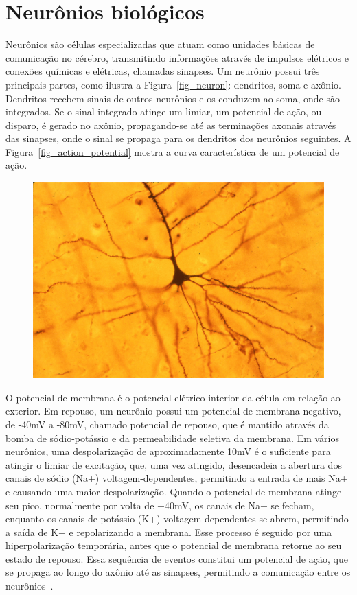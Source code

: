 \section{Neurônios biológicos}\label{sec_neurônios}

Neurônios são células especializadas que atuam como unidades básicas de comunicação no cérebro, transmitindo informações através
de impulsos elétricos e conexões químicas e elétricas, chamadas sinapses. Um neurônio possui três principais partes, como ilustra
a Figura~\ref{fig_neuron}: dendritos, soma e axônio. Dendritos recebem sinais de outros neurônios e os conduzem ao soma,
onde são integrados. Se o sinal integrado atinge um limiar, um potencial de ação, ou disparo, é gerado no axônio, propagando-se
até as terminações axonais através das sinapses, onde o sinal se propaga para os dendritos dos neurônios seguintes. A
Figura~\ref{fig_action_potential} mostra a curva característica de um potencial de ação.

\begin{figure}[!ht]
\centering
\includegraphics[width=12cm]{figuras/neuron.png}
\end{figure}

O potencial de membrana é o potencial elétrico interior da célula em relação ao exterior. Em repouso, um neurônio possui um
potencial de membrana negativo, de -40mV a -80mV, chamado potencial de repouso, que é mantido através da bomba de sódio-potássio e
da permeabilidade seletiva da membrana. Em vários neurônios, uma despolarização de aproximadamente 10mV é o suficiente para
atingir o limiar de excitação, que, uma vez atingido, desencadeia a abertura dos canais de sódio (Na+) voltagem-dependentes,
permitindo a entrada de mais Na+ e causando uma maior despolarização. Quando o potencial de membrana atinge seu pico, normalmente
por volta de +40mV, os canais de Na+ se fecham, enquanto os canais de potássio (K+) voltagem-dependentes se abrem, permitindo a
saída de K+ e repolarizando a membrana. Esse processo é seguido por uma hiperpolarização temporária, antes que o potencial de
membrana retorne ao seu estado de repouso. Essa sequência de eventos constitui um potencial de ação, que se propaga ao longo do
axônio até as sinapses, permitindo a comunicação entre os neurônios~\cite{kandelPrinciples2021}.

